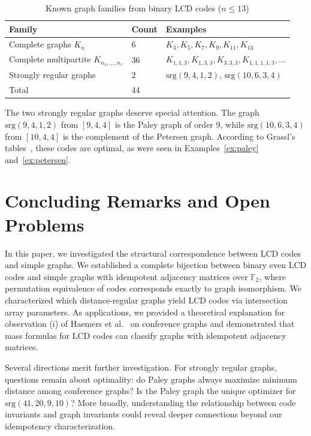 \documentclass[a4paper,11pt]{article}
\theoremstyle{remark}
\newcommand{\FF}{\mathbb{F}}
\begin{document}
\begin{table}[h]
\centering
\caption{Known graph families from binary LCD codes ($n \leq 13$)}
\label{tab:known-families}
\footnotesize
\begin{tabular}{lll}
\hline
Family & Count & Examples \\
\hline
Complete graphs $K_n$ & 6 & $K_3, K_5, K_7, K_9, K_{11}, K_{13}$ \\
Complete multipartite $K_{n_1,\ldots,n_r}$ & 36 & $K_{1,1,3}, K_{1,3,3}, K_{3,3,3}, K_{1,1,1,1,3}, \ldots$ \\
Strongly regular graphs & 2 & $\text{srg}(9,4,1,2)$, $\text{srg}(10,6,3,4)$ \\
\hline
Total & 44 & \\
\hline
\end{tabular}
\end{table}

The two strongly regular graphs deserve special attention. The graph $\text{srg}(9,4,1,2)$ from $[9,4,4]$ is the Paley graph of order 9, while $\text{srg}(10,6,3,4)$ from $[10,4,4]$ is the complement of the Petersen graph.
According to Grassl's tables~\cite{grassl}, these codes are optimal, as were seen in Examples~\ref{ex:paley} and~\ref{ex:petersen}.

\section{Concluding Remarks and Open Problems}\label{sec:conclusion}

In this paper, we investigated the structural correspondence between LCD codes and simple graphs. We established a complete bijection between binary even LCD codes and simple graphs with idempotent adjacency matrices over $\FF_2$, where permutation equivalence of codes corresponds exactly to graph isomorphism. We characterized which distance-regular graphs yield LCD codes via intersection array parameters. As applications, we provided a theoretical explanation for observation (i) of Haemers et al.\ \cite{haemers1999} on conference graphs and demonstrated that mass formulas for LCD codes can classify graphs with idempotent adjacency matrices.

Several directions merit further investigation. For strongly regular graphs, questions remain about optimality: do Paley graphs always maximize minimum distance among conference graphs? Is the Paley graph the unique optimizer for $\text{srg}(41,20,9,10)$?
More broadly, understanding the relationship between code invariants and graph invariants could reveal deeper connections beyond our idempotency characterization.
\end{document}
